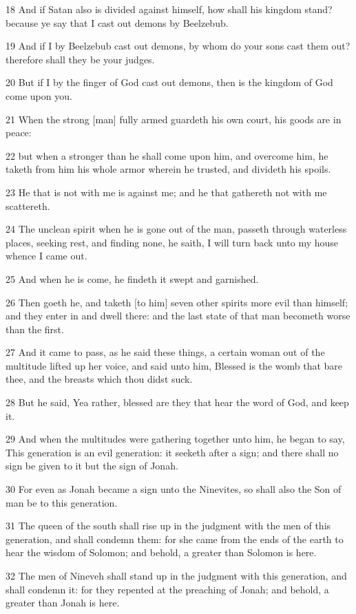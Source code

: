 \par 18 And if Satan also is divided against himself, how shall his kingdom stand? because ye say that I cast out demons by Beelzebub.
\par 19 And if I by Beelzebub cast out demons, by whom do your sons cast them out? therefore shall they be your judges.
\par 20 But if I by the finger of God cast out demons, then is the kingdom of God come upon you.
\par 21 When the strong [man] fully armed guardeth his own court, his goods are in peace:
\par 22 but when a stronger than he shall come upon him, and overcome him, he taketh from him his whole armor wherein he trusted, and divideth his spoils.
\par 23 He that is not with me is against me; and he that gathereth not with me scattereth.
\par 24 The unclean spirit when he is gone out of the man, passeth through waterless places, seeking rest, and finding none, he saith, I will turn back unto my house whence I came out.
\par 25 And when he is come, he findeth it swept and garnished.
\par 26 Then goeth he, and taketh [to him] seven other spirits more evil than himself; and they enter in and dwell there: and the last state of that man becometh worse than the first.
\par 27 And it came to pass, as he said these things, a certain woman out of the multitude lifted up her voice, and said unto him, Blessed is the womb that bare thee, and the breasts which thou didst suck.
\par 28 But he said, Yea rather, blessed are they that hear the word of God, and keep it.
\par 29 And when the multitudes were gathering together unto him, he began to say, This generation is an evil generation: it seeketh after a sign; and there shall no sign be given to it but the sign of Jonah.
\par 30 For even as Jonah became a sign unto the Ninevites, so shall also the Son of man be to this generation.
\par 31 The queen of the south shall rise up in the judgment with the men of this generation, and shall condemn them: for she came from the ends of the earth to hear the wisdom of Solomon; and behold, a greater than Solomon is here.
\par 32 The men of Nineveh shall stand up in the judgment with this generation, and shall condemn it: for they repented at the preaching of Jonah; and behold, a greater than Jonah is here.
